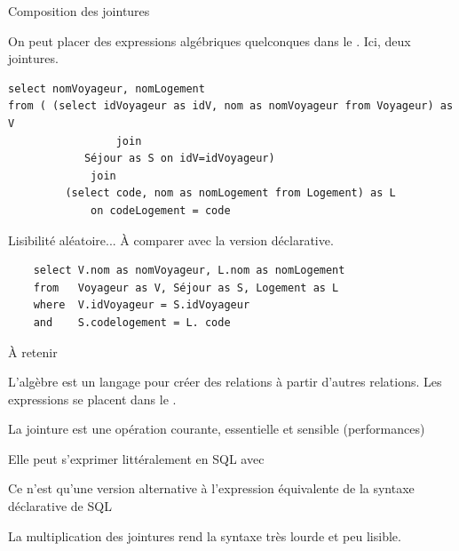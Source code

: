 \begin{frame}[fragile]{Composition des jointures}

On peut placer des expressions algébriques quelconques dans le . Ici, deux jointures.
\vfill


\begin{verbatim}
select nomVoyageur, nomLogement
from ( (select idVoyageur as idV, nom as nomVoyageur from Voyageur) as V
                 join
            Séjour as S on idV=idVoyageur)
             join
         (select code, nom as nomLogement from Logement) as L
             on codeLogement = code
\end{verbatim}

\vfill

Lisibilité aléatoire... À comparer avec la version déclarative.

\vfill

\begin{verbatim}
    select V.nom as nomVoyageur, L.nom as nomLogement
    from   Voyageur as V, Séjour as S, Logement as L
    where  V.idVoyageur = S.idVoyageur
    and    S.codelogement = L. code
\end{verbatim}

\end{frame}

\begin{frame}{À retenir}

L'algèbre est un langage pour créer des relations à partir d'autres relations. Les 
\alert{expressions} se placent dans le .
\vfill

\begin{redbullet}
   \item La jointure est une opération courante, essentielle et sensible (performances)
  \item Elle peut s'exprimer littéralement en SQL avec 
  \item Ce n'est qu'une version alternative à l'expression équivalente de la syntaxe déclarative de SQL
\end{redbullet}

\vfill
\begin{blocgauche}
La multiplication des jointures rend la syntaxe très lourde et peu lisible.
\end{blocgauche}
\end{frame}


